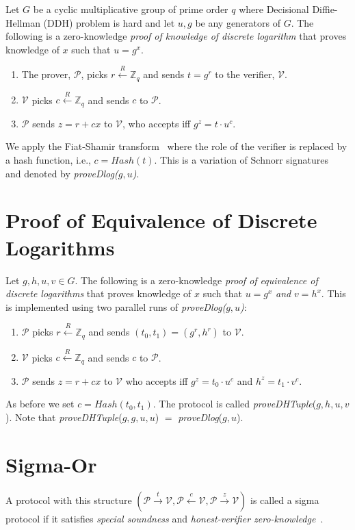 \documentclass[runningheads]{llncs}
\begin{document}
Let $G$ be a cyclic multiplicative group of prime order $q$ where Decisional Diffie-Hellman (DDH) problem is hard and let $u, g$ be any generators of $G$. 
The following is a zero-knowledge {\em proof of knowledge of discrete logarithm} that proves knowledge of $x$ such that $u = g^x$. 
\begin{enumerate}
	\item The prover, $\mathcal{P}$, picks $r \stackrel{R}{\leftarrow} \mathbb{Z}_q$ and sends $t = g^r$ to the verifier, $\mathcal{V}$.
	\item $\mathcal{V}$ picks $c \stackrel{R}{\leftarrow} \mathbb{Z}_q$ and sends $c$ to $\mathcal{P}$.
	\item $\mathcal{P}$ sends $z = r + cx$ to $\mathcal{V}$, who accepts iff ${g}^z = t\cdot {u}^c$. 
\end{enumerate}

We apply the Fiat-Shamir transform~\cite{fiatshamir} where the role of the verifier is replaced by a hash function, i.e., $c = Hash(t)$.
This is a variation of Schnorr signatures~\cite{Sch91} and denoted by \emph{proveDlog($g, u$)}.

\section{Proof of Equivalence of Discrete Logarithms}
\label{provedhtuple}
Let $g, h, u, v \in G$. The following is a zero-knowledge {\em proof of equivalence of discrete logarithms} that proves knowledge of $x$ such that $u = g^x$ {\em and} $v = h^x$. This is implemented using two parallel runs of \emph{proveDlog($g, u$)}:

\begin{enumerate}
	\item $\mathcal{P}$ picks $r \stackrel{R}{\leftarrow} \mathbb{Z}_q$ and sends $(t_0, t_1) = ({g}^r, {h}^r)$ to $\mathcal{V}$.
	\item $\mathcal{V}$ picks $c \stackrel{R}{\leftarrow} \mathbb{Z}_q$ and sends $c$ to $\mathcal{P}$.
	\item $\mathcal{P}$ sends $z = r + cx$ to $\mathcal{V}$ who accepts iff ${g}^z = {t_0}\cdot {u}^c$ and $h^z=t_1\cdot v^c$.
\end{enumerate}

As before we set $c = Hash(t_0, t_1)$. The protocol is called \emph{proveDHTuple}($g, h, u, v$). Note that \emph{proveDHTuple}($g, g, u, u$) $=$ \emph{proveDlog}($g, u$).

\section{Sigma-Or}
\label{sigmaor}
A protocol with this structure $(\mathcal{P} \stackrel{t}{\rightarrow}\mathcal{V}, \mathcal{P} \stackrel{c}{\leftarrow}\mathcal{V}, \mathcal{P} \stackrel{z}{\rightarrow}\mathcal{V})$ is called a sigma protocol if it satisfies {\em special soundness} and {\em honest-verifier zero-knowledge}~\cite{Dam10}. 
\end{document}
